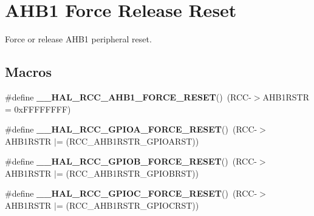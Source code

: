 \hypertarget{group___r_c_c___a_h_b1___force___release___reset}{}\section{A\+H\+B1 Force Release Reset}
\label{group___r_c_c___a_h_b1___force___release___reset}


Force or release A\+H\+B1 peripheral reset.  


\subsection*{Macros}
\begin{DoxyCompactItemize}
\item 
\#define {\bfseries \+\_\+\+\_\+\+H\+A\+L\+\_\+\+R\+C\+C\+\_\+\+A\+H\+B1\+\_\+\+F\+O\+R\+C\+E\+\_\+\+R\+E\+S\+ET}()~(R\+CC-\/$>$A\+H\+B1\+R\+S\+TR = 0x\+F\+F\+F\+F\+F\+F\+F\+F)\hypertarget{group___r_c_c___a_h_b1___force___release___reset_ga87d828d91e67aaa931853a60779826c2}{}\label{group___r_c_c___a_h_b1___force___release___reset_ga87d828d91e67aaa931853a60779826c2}

\item 
\#define {\bfseries \+\_\+\+\_\+\+H\+A\+L\+\_\+\+R\+C\+C\+\_\+\+G\+P\+I\+O\+A\+\_\+\+F\+O\+R\+C\+E\+\_\+\+R\+E\+S\+ET}()~(R\+CC-\/$>$A\+H\+B1\+R\+S\+TR $\vert$= (R\+C\+C\+\_\+\+A\+H\+B1\+R\+S\+T\+R\+\_\+\+G\+P\+I\+O\+A\+R\+ST))\hypertarget{group___r_c_c___a_h_b1___force___release___reset_gab329bd497cccffd979bcca9fd42bbc79}{}\label{group___r_c_c___a_h_b1___force___release___reset_gab329bd497cccffd979bcca9fd42bbc79}

\item 
\#define {\bfseries \+\_\+\+\_\+\+H\+A\+L\+\_\+\+R\+C\+C\+\_\+\+G\+P\+I\+O\+B\+\_\+\+F\+O\+R\+C\+E\+\_\+\+R\+E\+S\+ET}()~(R\+CC-\/$>$A\+H\+B1\+R\+S\+TR $\vert$= (R\+C\+C\+\_\+\+A\+H\+B1\+R\+S\+T\+R\+\_\+\+G\+P\+I\+O\+B\+R\+ST))\hypertarget{group___r_c_c___a_h_b1___force___release___reset_ga3b89be9638638ffce3ebd4f08a3b64cf}{}\label{group___r_c_c___a_h_b1___force___release___reset_ga3b89be9638638ffce3ebd4f08a3b64cf}

\item 
\#define {\bfseries \+\_\+\+\_\+\+H\+A\+L\+\_\+\+R\+C\+C\+\_\+\+G\+P\+I\+O\+C\+\_\+\+F\+O\+R\+C\+E\+\_\+\+R\+E\+S\+ET}()~(R\+CC-\/$>$A\+H\+B1\+R\+S\+TR $\vert$= (R\+C\+C\+\_\+\+A\+H\+B1\+R\+S\+T\+R\+\_\+\+G\+P\+I\+O\+C\+R\+ST))\hypertarget{group___r_c_c___a_h_b1___force___release___reset_ga6e6a20fa8e0d7b3ebfdce26f6b1a1ed0}{}\label{group___r_c_c___a_h_b1___force___release___reset_ga6e6a20fa8e0d7b3ebfdce26f6b1a1ed0}


\end{DoxyCompactItemize}
